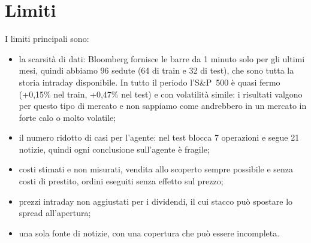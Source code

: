 \documentclass[11pt,a4paper]{article}
\begin{document}
\section{Limiti}
I limiti principali sono:
\begin{itemize}
  \item la scarsità di dati: Bloomberg fornisce le barre da 1 minuto solo per gli ultimi mesi, quindi abbiamo 96 sedute (64 di train e 32 di test), che sono tutta la storia intraday disponibile. In tutto il periodo l'S\&P~500 è quasi fermo (+0,15\% nel train, +0,47\% nel test) e con volatilità simile: i risultati valgono per questo tipo di mercato e non sappiamo come andrebbero in un mercato in forte calo o molto volatile;
  \item il numero ridotto di casi per l'agente: nel test blocca 7 operazioni e segue 21 notizie, quindi ogni conclusione sull'agente è fragile;
  \item costi stimati e non misurati, vendita allo scoperto sempre possibile e senza costi di prestito, ordini eseguiti senza effetto sul prezzo;
  \item prezzi intraday non aggiustati per i dividendi, il cui stacco può spostare lo spread all'apertura;
  \item una sola fonte di notizie, con una copertura che può essere incompleta.
\end{itemize}
\end{document}

